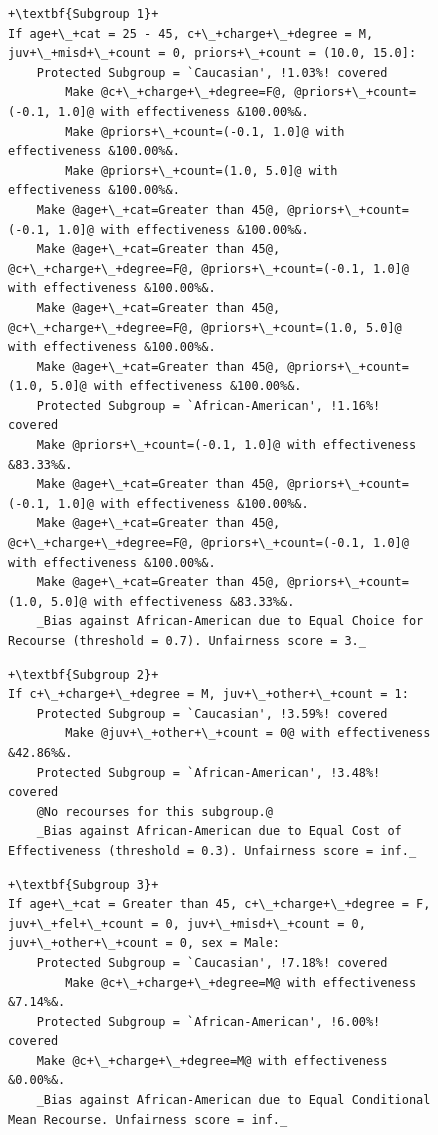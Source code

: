 \documentclass{article}
\begin{document}
\begin{table}[ht]
{\begin{tabular}{lccccccccc}
\bottomrule
\end{tabular}%
}
\end{table}


\begin{figure}[ht]
\centering
\begin{minipage}{1\linewidth}
\begin{lstlisting}[style = base,escapechar=+]
+\textbf{Subgroup 1}+
If age+\_+cat = 25 - 45, c+\_+charge+\_+degree = M, juv+\_+misd+\_+count = 0, priors+\_+count = (10.0, 15.0]:
    Protected Subgroup = `Caucasian', !1.03%! covered
        Make @c+\_+charge+\_+degree=F@, @priors+\_+count=(-0.1, 1.0]@ with effectiveness &100.00%&.
        Make @priors+\_+count=(-0.1, 1.0]@ with effectiveness &100.00%&.
        Make @priors+\_+count=(1.0, 5.0]@ with effectiveness &100.00%&.
	Make @age+\_+cat=Greater than 45@, @priors+\_+count=(-0.1, 1.0]@ with effectiveness &100.00%&.
	Make @age+\_+cat=Greater than 45@, @c+\_+charge+\_+degree=F@, @priors+\_+count=(-0.1, 1.0]@ with effectiveness &100.00%&.
	Make @age+\_+cat=Greater than 45@, @c+\_+charge+\_+degree=F@, @priors+\_+count=(1.0, 5.0]@ with effectiveness &100.00%&.
	Make @age+\_+cat=Greater than 45@, @priors+\_+count=(1.0, 5.0]@ with effectiveness &100.00%&.
    Protected Subgroup = `African-American', !1.16%! covered
	Make @priors+\_+count=(-0.1, 1.0]@ with effectiveness &83.33%&.
	Make @age+\_+cat=Greater than 45@, @priors+\_+count=(-0.1, 1.0]@ with effectiveness &100.00%&.
	Make @age+\_+cat=Greater than 45@, @c+\_+charge+\_+degree=F@, @priors+\_+count=(-0.1, 1.0]@ with effectiveness &100.00%&.
	Make @age+\_+cat=Greater than 45@, @priors+\_+count=(1.0, 5.0]@ with effectiveness &83.33%&.
    _Bias against African-American due to Equal Choice for Recourse (threshold = 0.7). Unfairness score = 3._
\end{lstlisting}
\begin{lstlisting}[style = base,escapechar=+]
+\textbf{Subgroup 2}+
If c+\_+charge+\_+degree = M, juv+\_+other+\_+count = 1:
    Protected Subgroup = `Caucasian', !3.59%! covered
        Make @juv+\_+other+\_+count = 0@ with effectiveness &42.86%&.
    Protected Subgroup = `African-American', !3.48%! covered
	@No recourses for this subgroup.@
    _Bias against African-American due to Equal Cost of Effectiveness (threshold = 0.3). Unfairness score = inf._
\end{lstlisting}
\begin{lstlisting}[style = base,escapechar=+]
+\textbf{Subgroup 3}+
If age+\_+cat = Greater than 45, c+\_+charge+\_+degree = F, juv+\_+fel+\_+count = 0, juv+\_+misd+\_+count = 0, juv+\_+other+\_+count = 0, sex = Male:
    Protected Subgroup = `Caucasian', !7.18%! covered
        Make @c+\_+charge+\_+degree=M@ with effectiveness &7.14%&.
    Protected Subgroup = `African-American', !6.00%! covered
	Make @c+\_+charge+\_+degree=M@ with effectiveness &0.00%&.
    _Bias against African-American due to Equal Conditional Mean Recourse. Unfairness score = inf._
\end{lstlisting}


\end{minipage}
\end{figure}
\end{document}
